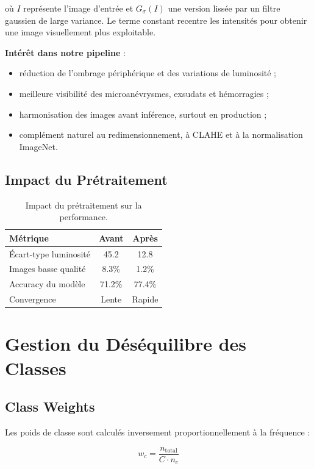 \documentclass[12pt,a4paper,oneside]{report}
\begin{document}
où $I$ représente l'image d'entrée et $G_{\sigma}(I)$ une version lissée
par un filtre gaussien de large variance. Le terme constant recentre les
intensités pour obtenir une image visuellement plus exploitable.

\textbf{Intérêt dans notre pipeline} :
\begin{itemize}
    \item réduction de l'ombrage périphérique et des variations de luminosité ;
    \item meilleure visibilité des microanévrysmes, exsudats et hémorragies ;
    \item harmonisation des images avant inférence, surtout en production ;
    \item complément naturel au redimensionnement, à CLAHE et à la normalisation ImageNet.
\end{itemize}

\subsection{Impact du Prétraitement}

\begin{table}[H]
\centering
\caption{Impact du prétraitement sur la performance.}
\label{tab:preprocessing_impact}
\begin{tabular}{|l|c|c|}
\hline
\textbf{Métrique} & \textbf{Avant} & \textbf{Après} \\
\hline
Écart-type luminosité & 45.2 & 12.8 \\
Images basse qualité & 8.3\% & 1.2\% \\
Accuracy du modèle & 71.2\% & 77.4\% \\
Convergence & Lente & Rapide \\
\hline
\end{tabular}
\end{table}

\section{Gestion du Déséquilibre des Classes}

\subsection{Class Weights}

Les poids de classe sont calculés inversement proportionnellement à
la fréquence :

\begin{equation}
w_c = \frac{n_{\text{total}}}{C \cdot n_c}
\label{eq:class_weights}
\end{equation}
\end{document}
